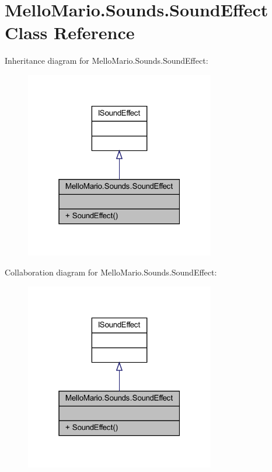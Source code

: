 \section{Mello\+Mario.\+Sounds.\+Sound\+Effect Class Reference}
\label{classMelloMario_1_1Sounds_1_1SoundEffect}


Inheritance diagram for Mello\+Mario.\+Sounds.\+Sound\+Effect\+:
\nopagebreak
\begin{figure}[H]
\begin{center}
\leavevmode
\includegraphics[width=235pt]{classMelloMario_1_1Sounds_1_1SoundEffect__inherit__graph}
\end{center}
\end{figure}


Collaboration diagram for Mello\+Mario.\+Sounds.\+Sound\+Effect\+:
\nopagebreak
\begin{figure}[H]
\begin{center}
\leavevmode
\includegraphics[width=235pt]{classMelloMario_1_1Sounds_1_1SoundEffect__coll__graph}
\end{center}
\end{figure}
